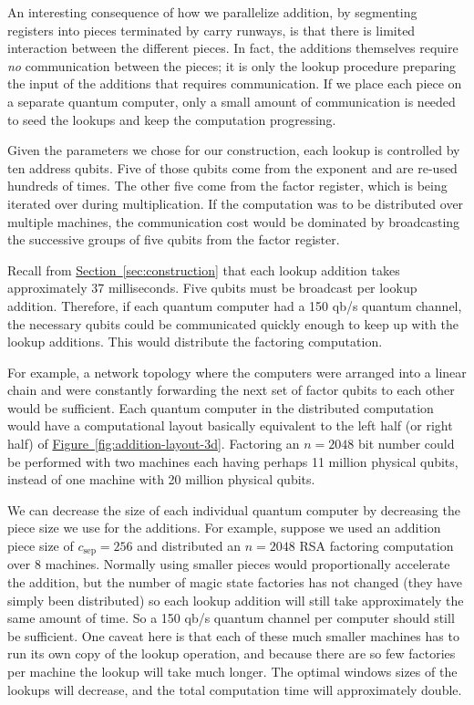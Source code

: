 \documentclass[superscriptaddress,notitlepage,longbibliography]{revtex4-1}
\theoremstyle{definition}
\theoremstyle{definition}
\renewcommand{\sec}[1]{\hyperref[sec:#1]{Section~\ref*{sec:#1}}}
\newcommand{\fig}[1]{\hyperref[fig:#1]{Figure~\ref*{fig:#1}}}
\newcommand{\gsep}{{c_{\text{sep}}}}
\begin{document}
An interesting consequence of how we parallelize addition, by segmenting registers into pieces terminated by carry runways, is that there is limited interaction between the different pieces.
In fact, the additions themselves require {\em no} communication between the pieces; it is only the lookup procedure preparing the input of the additions that requires communication.
If we place each piece on a separate quantum computer, only a small amount of communication is needed to seed the lookups and keep the computation progressing.

Given the parameters we chose for our construction, each lookup is controlled by ten address qubits.
Five of those qubits come from the exponent and are re-used hundreds of times.
The other five come from the factor register, which is being iterated over during multiplication.
If the computation was to be distributed over multiple machines, the communication cost would be dominated by broadcasting the successive groups of five qubits from the factor register.

Recall from \sec{construction} that each lookup addition takes approximately 37 milliseconds.
Five qubits must be broadcast per lookup addition.
Therefore, if each quantum computer had a 150 qb/s quantum channel, the necessary qubits could be communicated quickly enough to keep up with the lookup additions.
This would distribute the factoring computation.

For example, a network topology where the computers were arranged into a linear chain and were constantly forwarding the next set of factor qubits to each other would be sufficient.
Each quantum computer in the distributed computation would have a computational layout basically equivalent to the left  half (or right half) of \fig{addition-layout-3d}.
Factoring an $n=2048$ bit number could be performed with two machines each having perhaps 11 million physical qubits, instead of one machine with 20 million physical qubits.

We can decrease the size of each individual quantum computer by decreasing the piece size we use for the additions.
For example, suppose we used an addition piece size of $\gsep=256$ and distributed an $n=2048$ RSA factoring computation over 8 machines.
Normally using smaller pieces would proportionally accelerate the addition, but the number of magic state factories has not changed (they have simply been distributed) so each lookup addition will still take approximately the same amount of time.
So a 150 qb/s quantum channel per computer should still be sufficient.
One caveat here is that each of these much smaller machines has to run its own copy of the lookup operation, and because there are so few factories per machine the lookup will take much longer.
The optimal windows sizes of the lookups will decrease, and the total computation time will approximately double.
\end{document}
